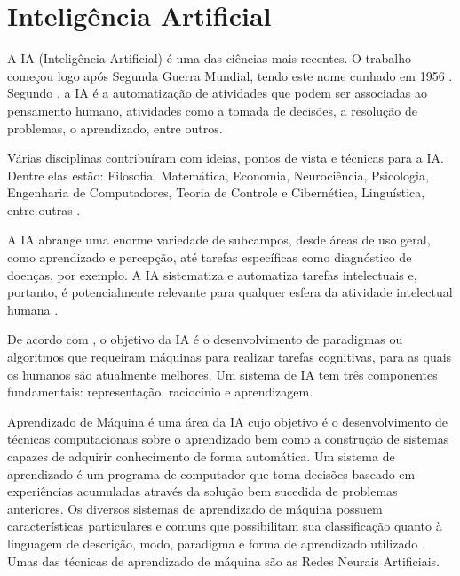 \section{Inteligência Artificial}
\label{sec:IA}
A IA (Inteligência Artificial) é uma das ciências mais recentes. O trabalho começou logo após Segunda Guerra Mundial, tendo este nome cunhado em 1956 \cite{russell2004inteligencia}. Segundo , a IA é a automatização de atividades que podem ser associadas ao pensamento humano, atividades como a tomada de decisões, a resolução de problemas, o aprendizado, entre outros.

Várias disciplinas contribuíram com ideias, pontos de vista e técnicas para a IA. Dentre elas estão: Filosofia, Matemática, Economia, Neurociência, Psicologia, Engenharia de Computadores, Teoria de Controle e Cibernética, Linguística, entre outras \cite{russell2004inteligencia}.

A IA abrange uma enorme variedade de subcampos, desde áreas de uso geral, como aprendizado e percepção, até tarefas específicas como diagnóstico de doenças, por exemplo. A IA sistematiza e automatiza tarefas intelectuais e, portanto, é potencialmente relevante para qualquer esfera da atividade intelectual humana \cite{russell2004inteligencia}.

De acordo com , o objetivo da IA é o desenvolvimento de paradigmas ou algoritmos que requeiram máquinas para realizar tarefas cognitivas, para as quais os humanos são atualmente melhores. Um sistema de IA tem três componentes fundamentais: representação, raciocínio e aprendizagem.

Aprendizado de Máquina é uma área da IA cujo objetivo é o desenvolvimento de técnicas computacionais sobre o aprendizado bem como a construção de sistemas capazes de adquirir conhecimento de forma automática. Um sistema de aprendizado é um programa de computador que toma decisões baseado em experiências acumuladas através da solução bem sucedida de problemas anteriores. Os diversos sistemas de aprendizado de máquina possuem características particulares e comuns que possibilitam sua classificação quanto à linguagem de descrição, modo, paradigma e forma de aprendizado utilizado \cite{monard2003sistemas}.
Umas das técnicas de aprendizado de máquina são as Redes Neurais Artificiais.



